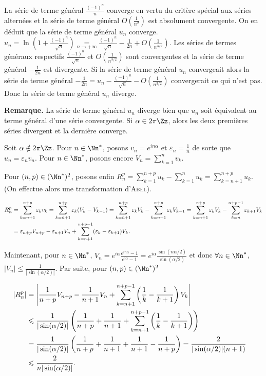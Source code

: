 {{La série de terme général $\frac{(-1)^n}{n}$ converge en vertu du critère spécial aux séries alternées et la série de terme général $O\left(\frac{1}{n^2}\right)$ est absolument convergente. On en déduit que la série de terme général $u_n$ converge.
$u_n=\ln\left(1+\frac{(-1)^n}{\sqrt{n}}\right)\underset{n\rightarrow+\infty}{=}\frac{(-1)^n}{\sqrt{n}}-\frac{1}{2n}+ O\left(\frac{1}{n^{3/2}}\right)$. Les séries de termes généraux respectifs $\frac{(-1)^n}{\sqrt{n}}$  et $O\left(\frac{1}{n^{3/2}}\right)$ sont convergentes et la série de terme général $-\frac{1}{2n}$  est divergente. Si la série de terme général $u_n$ convergeait alors la série de terme général $-\frac{1}{2n}=u_n-\frac{(-1)^n}{\sqrt{n}}-O\left(\frac{1}{n^{3/2}}\right)$ convergerait ce qui n'est pas. Donc la série de terme général $u_n$ diverge.

\textbf{Remarque.} La série de terme général $u_n$ diverge bien que $u_n$ soit équivalent au terme général d'une série convergente.
Si $\alpha\in2\pi\Zz$, alors les deux premières séries divergent et la dernière converge.

Soit $\alpha\notin2\pi\Zz$. Pour $n\in\Nn^*$, posons $v_n=e^{in\alpha}$ et $\varepsilon_n=\frac{1}{n}$ de sorte que $u_n=\varepsilon_nv_n$. Pour $n\in\Nn^*$, posons encore $V_n =\sum_{k=1}^{n}v_k$.

Pour $(n ,p)\in(\Nn^*)^2$, posons enfin $R_n^p=\sum_{k=1}^{n+p}u_k-\sum_{k=1}^{n}u_k=\sum_{k=n+1}^{n+p}u_k$. (On effectue alors une transformation d'\textsc{Abel}).

\begin{align*}\ensuremath
R_n^p&=\sum_{k=n+1}^{n+p}\varepsilon_kv_k =\sum_{k=n+1}^{n+p}\varepsilon_k(V_k-V_{k-1}) =\sum_{k=n+1}^{n+p}\varepsilon_kV_k-\sum_{k=n+1}^{n+p}\varepsilon_kV_{k-1} =\sum_{k=n+1}^{n+p}\varepsilon_kV_k-\sum_{k=n}^{n+p-1}\varepsilon_{k+1}V_{k}\\
 &=\varepsilon_{n+p}V_{n+p}-\varepsilon_{n+1}V_n+ \sum_{k=n+1}^{n+p-1}(\varepsilon_k-\varepsilon_{k+1})V_k.
\end{align*}

Maintenant, pour $n\in\Nn^*$, $V_n=e^{i\alpha}\frac{e^{in\alpha}-1}{e^{i\alpha}-1}=e^{i\alpha}\frac{\sin(n\alpha/2)}{\sin(\alpha/2)}$  et donc $\forall n\in\Nn^*$, $|V_n|\leqslant\frac{1}{|\sin(\alpha/2)|}$. Par suite, pour $(n,p)\in(\Nn^*)^2$

\begin{align*}\ensuremath
|R_n^p|&=\left|\frac{1}{n+p}V_{n+p}-\frac{1}{n+1}V_n+ \sum_{k=n+1}^{n+p-1}\left(\frac{1}{k}-\frac{1}{k+1}\right)V_k\right|&\\
 &\leqslant\frac{1}{|\sin(\alpha/2)|}\left(\frac{1}{n+p}+\frac{1}{n+1}+ \sum_{k=n+1}^{n+p-1}\left(\frac{1}{k}-\frac{1}{k+1}\right)\right)\\
 &=\frac{1}{|\sin(\alpha/2)|}\left(\frac{1}{n+p}+\frac{1}{n+1}+\frac{1}{n+1}-\frac{1}{n+p}\right)=\frac{2}{|\sin(\alpha/2)|(n+1)}\\
  &\leqslant\frac{2}{n|\sin(\alpha/2)|}.
\end{align*}

}}
